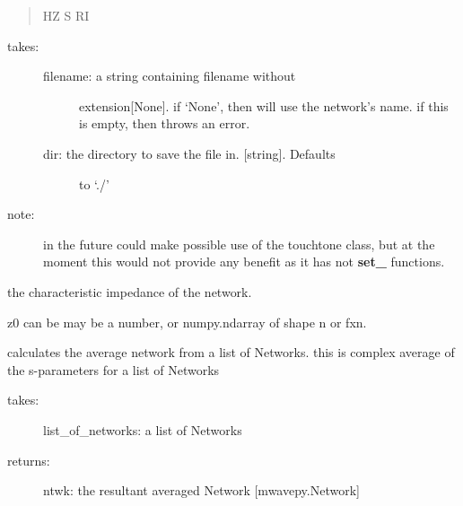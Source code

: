 \documentclass[letterpaper,10pt,english]{sphinxmanual}
\begin{document}
\begin{fulllineitems}
\begin{fulllineitems}
\begin{quote}
HZ S RI
\end{quote}
\begin{description}
\item[{takes: }] \leavevmode\begin{description}
\item[{filename: a string containing filename without }] \leavevmode
extension{[}None{]}. if `None', then will use the network's 
name. if this is empty, then throws an error.

\item[{dir: the directory to save the file in. {[}string{]}. Defaults }] \leavevmode
to `./'

\end{description}

\item[{note:}] \leavevmode
in the future could make possible use of the touchtone 
class, but at the moment this would not provide any benefit 
as it has not {\color{red}\bfseries{}set\_} functions.

\end{description}

\end{fulllineitems}


\begin{fulllineitems}
\label{api/mwavepy:mwavepy.network.Network.y}
\end{fulllineitems}


\begin{fulllineitems}
\label{api/mwavepy:mwavepy.network.Network.z0}
the characteristic impedance of the network.

z0 can be may be a number, or numpy.ndarray of shape n or fxn.

\end{fulllineitems}


\end{fulllineitems}


\begin{fulllineitems}
\label{api/mwavepy:mwavepy.network.average}
calculates the average network from a list of Networks. 
this is complex average of the s-parameters for a  list of Networks
\begin{description}
\item[{takes:}] \leavevmode
list\_of\_networks: a list of Networks

\item[{returns:}] \leavevmode
ntwk: the resultant averaged Network {[}mwavepy.Network{]}

\end{description}

\end{fulllineitems}
\end{document}
